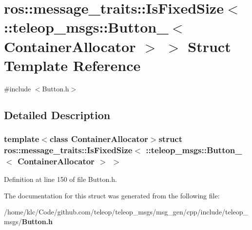 \section{ros::message\_\-traits::IsFixedSize$<$ ::teleop\_\-msgs::Button\_\-$<$ ContainerAllocator $>$ $>$ Struct Template Reference}
\label{structros_1_1message__traits_1_1IsFixedSize_3_01_1_1teleop__msgs_1_1Button___3_01ContainerAllocator_01_4_01_4}


{\ttfamily \#include $<$Button.h$>$}



\subsection{Detailed Description}
\subsubsection*{template$<$class ContainerAllocator$>$struct ros::message\_\-traits::IsFixedSize$<$ ::teleop\_\-msgs::Button\_\-$<$ ContainerAllocator $>$ $>$}



Definition at line 150 of file Button.h.



The documentation for this struct was generated from the following file:\begin{DoxyCompactItemize}
\item 
/home/klc/Code/github.com/teleop/teleop\_\-msgs/msg\_\-gen/cpp/include/teleop\_\-msgs/{\bf Button.h}\end{DoxyCompactItemize}

